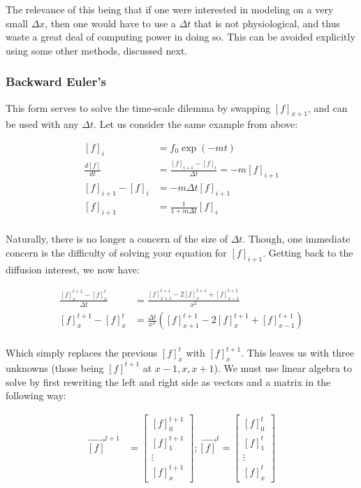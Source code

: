 \documentclass[12pt]{amsart}
\newcommand{\pr}[1]{\left(#1\right)}
\begin{document}
The relevance of this being that if one were interested in modeling on a very small $\Delta x$, then one would have to use a $\Delta t$ that is not physiological, and thus waste a great deal of computing power in doing so. This can be avoided explicitly using some other methods, discussed next. 

\subsubsection{Backward Euler's} This form serves to solve the time-scale dilemma by swapping $[f]_{x+1}$, and can be used with any $\Delta t$. Let us consider the same example from above: 

\begin{equation} \label{eq8}
\begin{split}
[f]_i & = f_0\exp(-mt) \\
\frac{d[f]}{dt} & = \frac{[f]_{i+1} - [f]_{i}}{\Delta t} = -m[f]_{i+1} \\
[f]_{i+1} - [f]_{i} & = -m\Delta t[f]_{i+1} \\
[f]_{i+1} & = \frac{1}{1+m\Delta t}[f]_{i} \\
\end{split}
\end{equation}

Naturally, there is no longer a concern of the size of $\Delta t$. Though, one immediate concern is the difficulty of solving your equation for $[f]_{i+1}$. Getting back to the diffusion interest, we now have:

\begin{equation} \label{eq8}
\begin{split}
\frac{[f]^{t+1}_{x} - [f]^{t}_{x}}{\Delta t} &= \frac{[f]^{t+1}_{x+1} - 2[f]^{t+1}_x + [f]^{t+1}_{x - 1}}{x^2}\\
[f]^{t+1}_{x} - [f]^{t}_{x} &= \frac{\Delta t}{x^2} \pr{[f]^{t+1}_{x+1} - 2[f]^{t+1}_x + [f]^{t+1}_{x - 1}} \\
\end{split}
\end{equation}


Which simply replaces the previous $[f]^{t}_{x}$ with $[f]^{t+1}_{x}$. This leaves us with three unknowns (those being $[f]^{t+1}$ at $x-1,x,x+1$). We must use linear algebra to solve by first rewriting the left and right side as vectors and a matrix in the following way: 

\begin{align}
\vec{[f]}^{t+1} &= \begin{bmatrix}
        [f]^{t+1}_{0} \\
        [f]^{t+1}_{1} \\
        \vdots \\
        [f]^{t+1}_{x}
\end{bmatrix}
; \vec{[f]}^{t} = \begin{bmatrix}
        [f]^{t}_{0} \\
        [f]^{t}_{1} \\
        \vdots \\
        [f]^{t}_{x}
\end{bmatrix}
\end{align}
\end{document}
